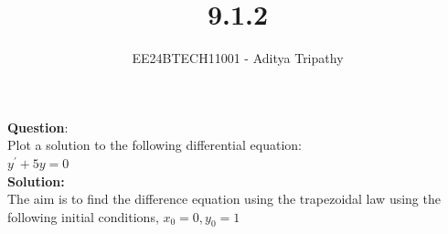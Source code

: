 \documentclass[journal]{IEEEtran}
\begin{document}

\vspace{3cm}

\title{9.1.2}
\author{EE24BTECH11001 - Aditya Tripathy}
 \maketitle
{\let\newpage\relax\maketitle}

\renewcommand{\thefigure}{\theenumi}
\renewcommand{\thetable}{\theenumi}
\setlength{\intextsep}{10pt} %


\renewcommand{\thetable}{\theenumi}


\textbf{Question}:\\
Plot a solution to the following differential equation:\\
    $y^\prime + 5y = 0$
\\
\textbf{Solution: }\\
The aim is to find the difference equation using the trapezoidal law using the following initial conditions,
$x_0 = 0, y_0 = 1$\\
\end{document}
